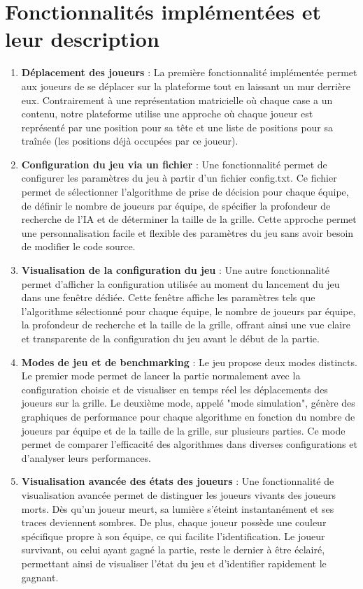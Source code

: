 \documentclass[a4paper,12pt]{article}
\begin{document}
\newpage

\section{Fonctionnalités implémentées et leur description}

\begin{enumerate}
    \item \textbf{Déplacement des joueurs} : 
    La première fonctionnalité implémentée permet aux joueurs de se déplacer sur la plateforme tout en laissant un mur derrière eux. Contrairement à une représentation matricielle où chaque case a un contenu, notre plateforme utilise une approche où chaque joueur est représenté par une position pour sa tête et une liste de positions pour sa traînée (les positions déjà occupées par ce joueur).

    \item \textbf{Configuration du jeu via un fichier} :
    Une fonctionnalité permet de configurer les paramètres du jeu à partir d'un fichier config.txt. Ce fichier permet de sélectionner l'algorithme de prise de décision pour chaque équipe, de définir le nombre de joueurs par équipe, de spécifier la profondeur de recherche de l'IA et de déterminer la taille de la grille. Cette approche permet une personnalisation facile et flexible des paramètres du jeu sans avoir besoin de modifier le code source.

    \item \textbf{Visualisation de la configuration du jeu} :
    Une autre fonctionnalité permet d'afficher la configuration utilisée au moment du lancement du jeu dans une fenêtre dédiée. Cette fenêtre affiche les paramètres tels que l'algorithme sélectionné pour chaque équipe, le nombre de joueurs par équipe, la profondeur de recherche et la taille de la grille, offrant ainsi une vue claire et transparente de la configuration du jeu avant le début de la partie.

    \item \textbf{Modes de jeu et de benchmarking} : Le jeu propose deux modes distincts. Le premier mode permet de lancer la partie normalement avec la configuration choisie et de visualiser en temps réel les déplacements des joueurs sur la grille. Le deuxième mode, appelé "mode simulation", génère des graphiques de performance pour chaque algorithme en fonction du nombre de joueurs par équipe et de la taille de la grille, sur plusieurs parties. Ce mode permet de comparer l'efficacité des algorithmes dans diverses configurations et d'analyser leurs performances.

    \item\textbf{Visualisation avancée des états des joueurs} :
    Une fonctionnalité de visualisation avancée permet de distinguer les joueurs vivants des joueurs morts. Dès qu'un joueur meurt, sa lumière s'éteint instantanément et ses traces deviennent sombres. De plus, chaque joueur possède une couleur spécifique propre à son équipe, ce qui facilite l'identification. Le joueur survivant, ou celui ayant gagné la partie, reste le dernier à être éclairé, permettant ainsi de visualiser l'état du jeu et d'identifier rapidement le gagnant.
\end{enumerate}
\end{document}
